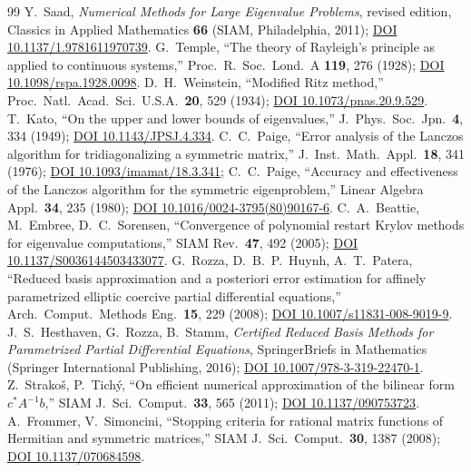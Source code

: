 \begin{thebibliography}{99}
 Y.~Saad, \emph{Numerical Methods for Large Eigenvalue Problems}, revised edition, Classics in Applied Mathematics \textbf{66} (SIAM, Philadelphia, 2011); \href{https://doi.org/10.1137/1.9781611970739}{DOI 10.1137/1.9781611970739}.
 G.~Temple, ``The theory of Rayleigh's principle as applied to continuous systems,'' Proc.\ R.\ Soc.\ Lond.\ A \textbf{119}, 276 (1928); \href{https://doi.org/10.1098/rspa.1928.0098}{DOI 10.1098/rspa.1928.0098}.
 D.~H.~Weinstein, ``Modified Ritz method,'' Proc.\ Natl.\ Acad.\ Sci.\ U.S.A.\ \textbf{20}, 529 (1934); \href{https://doi.org/10.1073/pnas.20.9.529}{DOI 10.1073/pnas.20.9.529}.
 T.~Kato, ``On the upper and lower bounds of eigenvalues,'' J.\ Phys.\ Soc.\ Jpn.\ \textbf{4}, 334 (1949); \href{https://doi.org/10.1143/JPSJ.4.334}{DOI 10.1143/JPSJ.4.334}.
 C.~C.~Paige, ``Error analysis of the Lanczos algorithm for tridiagonalizing a symmetric matrix,'' J.\ Inst.\ Math.\ Appl.\ \textbf{18}, 341 (1976); \href{https://doi.org/10.1093/imamat/18.3.341}{DOI 10.1093/imamat/18.3.341}; C.~C.~Paige, ``Accuracy and effectiveness of the Lanczos algorithm for the symmetric eigenproblem,'' Linear Algebra Appl.\ \textbf{34}, 235 (1980); \href{https://doi.org/10.1016/0024-3795(80)90167-6}{DOI 10.1016/0024-3795(80)90167-6}.
 C.~A.~Beattie, M.~Embree, D.~C.~Sorensen, ``Convergence of polynomial restart Krylov methods for eigenvalue computations,'' SIAM Rev.\ \textbf{47}, 492 (2005); \href{https://doi.org/10.1137/S0036144503433077}{DOI 10.1137/S0036144503433077}.
 G.~Rozza, D.~B.~P.~Huynh, A.~T.~Patera, ``Reduced basis approximation and a posteriori error estimation for affinely parametrized elliptic coercive partial differential equations,'' Arch.\ Comput.\ Methods Eng.\ \textbf{15}, 229 (2008); \href{https://doi.org/10.1007/s11831-008-9019-9}{DOI 10.1007/s11831-008-9019-9}.
 J.~S.~Hesthaven, G.~Rozza, B.~Stamm, \emph{Certified Reduced Basis Methods for Parametrized Partial Differential Equations}, SpringerBriefs in Mathematics (Springer International Publishing, 2016); \href{https://doi.org/10.1007/978-3-319-22470-1}{DOI 10.1007/978-3-319-22470-1}.
%
%
%
 Z.~Strako\v{s}, P.~Tich\'y, ``On efficient numerical approximation of the bilinear form $c^{*}A^{-1}b$,'' SIAM J.\ Sci.\ Comput.\ \textbf{33}, 565 (2011); \href{https://doi.org/10.1137/090753723}{DOI 10.1137/090753723}.
 A.~Frommer, V.~Simoncini, ``Stopping criteria for rational matrix functions of Hermitian and symmetric matrices,'' SIAM J.\ Sci.\ Comput.\ \textbf{30}, 1387 (2008); \href{https://doi.org/10.1137/070684598}{DOI 10.1137/070684598}.

\end{thebibliography}
